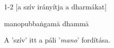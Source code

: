 
\begin{notesdescription}

\item[1-2][a szív irányítja a dharmákat]

manopubbaṅgamā dhammā

A 'szív' itt a páli '\textit{mano}' fordítása.  

\end{notesdescription}
